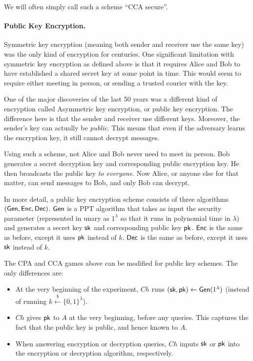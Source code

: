 We will often simply call such a scheme ``CCA secure''.


\paragraph{Public Key Encryption.}  Symmetric key encryption (meaning both sender and receiver use the same key) was the only kind of encryption for centuries.  One significant limitation with symmetric key encryption as defined above is that it requires Alice and Bob to have established a shared secret key at some point in time.  This would seem to require either meeting in person, or sending a trusted courier with the key.

One of the major discoveries of the last 50 years was a different kind of encryption called Asymmetric key encryption, or public key encryption.  The difference here is that the sender and receiver use different keys.  Moreover, the sender's key can actually be \emph{public}.  This means that even if the adversary learns the encryption key, it still cannot decrypt messages.

Using such a scheme, not Alice and Bob never need to meet in person.  Bob generates a secret decryption key and corresponding public encryption key. He then broadcasts the public key \emph{to everyone}.  Now Alice, or anyone else for that matter, can send messages to Bob, and only Bob can decrypt.

In more detail, a public key encryption scheme consists of three algorithms $({\sf Gen},{\sf Enc},{\sf Dec})$.  ${\sf Gen}$ is a PPT algorithm that takes as input the security parameter (represented in unary as $1^\lambda$ so that it runs in polynomial time in $\lambda$) and generates a secret key ${\sf sk}$ and corresponding public key ${\sf pk}$.  ${\sf Enc}$ is the same as before, except it uses ${\sf pk}$ instead of $k$.  ${\sf Dec}$ is the same as before, except it uses ${\sf sk}$ instead of $k$.

The CPA and CCA games above can be modified for public key schemes.  The only differences are:
\begin{itemize}
	\item At the very beginning of the experiment, $Ch$ runs $({\sf sk},{\sf pk})\gets{\sf Gen}(1^\lambda)$ (instead of running $k\stackrel{\$}{\gets}\{0,1\}^\lambda$).
	\item $Ch$ gives ${\sf pk}$ to $A$ at the very beginning, before any queries.  This captures the fact that the public key is public, and hence known to $A$.
	\item When answering encryption or decryption queries, $Ch$ inputs ${\sf sk}$ or ${\sf pk}$ into the encryption or decryption algorithm, respectively.
\end{itemize}


